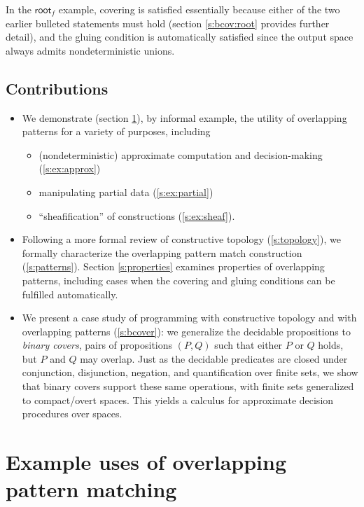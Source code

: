 \documentclass[conference]{IEEEtran}
\newcommand{\grammar}[1]{\textcolor{red}{\underline{#1}}}
\renewcommand{\grammar}[1]{#1}
\begin{document}
In the $\mathsf{root}_f$ example, covering is satisfied essentially because either of the two earlier bulleted statements must hold (section \ref{s:bcov:root} provides further detail), and the gluing condition is automatically satisfied since the output space always admits nondeterministic unions.


\subsection{Contributions}
\begin{itemize}
\item
We demonstrate (section \ref{s:examples}), by informal example, the utility of overlapping patterns for a variety of purposes, including
\begin{itemize}
\item (nondeterministic) approximate computation and decision-making (\ref{s:ex:approx})
\item manipulating partial data (\ref{s:ex:partial})
\item ``sheafification'' of constructions (\ref{s:ex:sheaf}).
\end{itemize}

\item Following a more formal review of constructive topology (\ref{s:topology}), we formally characterize the overlapping pattern match construction (\ref{s:patterns}). Section \ref{s:properties} examines properties of overlapping patterns, including cases when the covering and gluing conditions can be fulfilled automatically. 

\item We present a case study of programming with constructive topology and with overlapping patterns (\ref{s:bcover}): we generalize the decidable propositions to \emph{binary covers}, pairs of propositions $(P, Q)$ such that either $P$ or $Q$ holds, but $P$ and $Q$ may overlap. Just as the decidable predicates are closed under conjunction, disjunction, negation, and quantification over finite sets, we show that binary covers support these same operations, with finite sets generalized to compact/overt spaces. \grammar{This} yields a calculus for approximate decision procedures over spaces.

\end{itemize}

\section{Example uses of overlapping pattern matching}
\label{s:examples}
\end{document}

